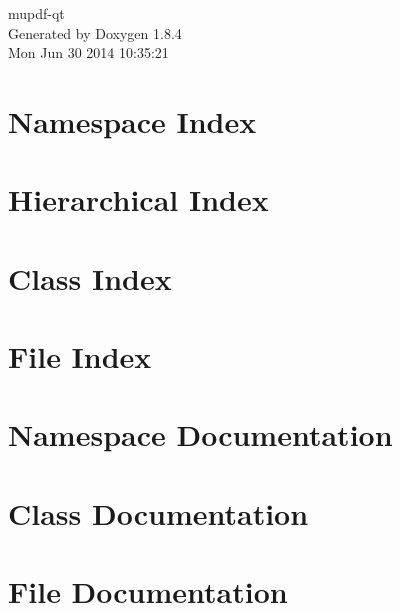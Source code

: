 \documentclass[twoside]{book}
\newcommand{\clearemptydoublepage}{%
  \newpage{\pagestyle{empty}\cleardoublepage}%
}
\begin{document}
\hypersetup{pageanchor=false}
\begin{titlepage}
\vspace*{7cm}
\begin{center}%
{\Large mupdf-\/qt }\\
\vspace*{1cm}
{\large Generated by Doxygen 1.8.4}\\
\vspace*{0.5cm}
{\small Mon Jun 30 2014 10:35:21}\\
\end{center}
\end{titlepage}
\clearemptydoublepage
\tableofcontents
\clearemptydoublepage
{}
\hypersetup{pageanchor=true}

\chapter{Namespace Index}

\chapter{Hierarchical Index}

\chapter{Class Index}

\chapter{File Index}

\chapter{Namespace Documentation}

\chapter{Class Documentation}











\chapter{File Documentation}












\newpage
{}
{}
\printindex
\end{document}
